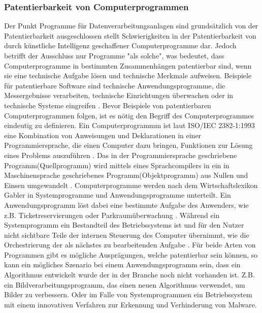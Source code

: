 \subsubsection{Patentierbarkeit von Computerprogrammen}
Der Punkt Programme für Datenverarbeitungsanlagen sind grundsätzlich
von der Patentierbarkeit ausgeschlossen stellt Schwierigkeiten in der 
Patentierbarkeit von durch künstliche
Intelligenz geschaffener Computerprogramme dar. 
Jedoch betrifft der Ausschluss nur Programme "als solche", 
was bedeutet, 
dass Computerprogramme in bestimmten Zusammenhängen patentierbar sind, 
wenn sie eine technische Aufgabe lösen und technische Merkmale aufweisen.
Beispiele für patentierbare Software sind technische Anwendungsprogramme, 
die Messergebnisse verarbeiten, 
technische Einrichtungen überwachen oder in technische Systeme eingreifen
\cite{redekerSchutzSoftware2023}.
Bevor Beispiele von patentierbaren Computerprogrammen folgen, ist es
nötig den Begriff des Computerprogrammes eindeutig zu definieren.
Ein Computerprogrammm ist laut ISO/IEC 2382-1:1993 
eine Kombination von Anweisungen und Deklarationen in einer
Programmiersprache, die einen Computer dazu bringen, 
Funktionen zur Lösung eines Problems auszuführen 
\cite{instituteofelectricalandelectronicsengineersinc.ISO47652010}.
Das in der Programmiersprache geschriebene Programm(Quellprogramm) wird 
mittels eines Sprachcompilers in ein in Maschinensprache geschriebenes 
Programm(Objektprogramm) aus Nullen und Einsen umgewandelt \cite{WasIstProgramm}.
Computerprogramme werden nach dem Wirtschaftslexikon Gabler in Systemprogramme
und Anwendungsprogramme unterteilt. 
Ein Anwendungsprogramm löst dabei eine bestimmte Aufgabe des Anwenders, 
wie z.B. Ticketreservierungen oder Parkraumüberwachung 
\cite{lackesDefinitionAnwendungsprogramm}. 
Während ein Systemprogramm ein Bestandteil des Betriebssystems ist und 
für den Nutzer nicht sichtbare Teile der internen Steuerung des Computer übernimmt,
wie die Orchestrierung der als nächstes zu bearbeitenden Aufgabe \cite{lackesDefinitionSystemprogramm}.
Für beide Arten von Programmen gibt es mögliche Ausprägungen, 
welche patentierbar sein können, so kann ein mögliches Szenario bei einem Anwendungsprogramm sein,
dass ein Algorithmus entwickelt wurde der in der Branche noch nicht vorhanden ist. Z.B. ein
Bildverarbeitungsprogramm, das einen neuen Algorithmus verwendet, um Bilder zu verbessern.
Oder im Falle von Systemprogrammen ein Betriebssystem mit einem 
innovativen Verfahren zur Erkennung und Verhinderung von Malware.
